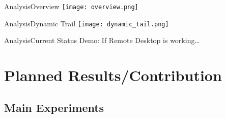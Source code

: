 \documentclass[10pt]{beamer}
\begin{document}
\begin{frame}{Analysis}{Overview}
  \texttt{[image: overview.png]}
\end{frame}
\begin{frame}{Analysis}{Dynamic Trail}
  \texttt{[image: dynamic\_tail.png]}
\end{frame}

\begin{frame}{Analysis}{Current Status}
  Demo: If Remote Desktop is working\ldots
\end{frame}

\section{Planned Results/Contribution}

\subsection{Main Experiments}
\end{document}
